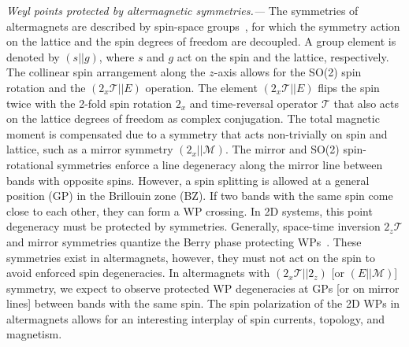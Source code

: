 \documentclass[aps,prb,twocolumn,amsmath,amssymb,floatfix]{revtex4-2}
\begin{document}
\textit{Weyl points protected by altermagnetic symmetries.---}
The symmetries of altermagnets are described by spin-space groups~\cite{https://doi.org/10.1002/pssb.2220100206,doi:10.1098/rspa.1966.0211,10.1063/1.1708514,LITVIN1974538,xiao2023spin,ren2023enumeration,jiang2023enumeration,chen2023spin,schiff2023spin}, for which the symmetry action on the lattice and the spin degrees of freedom are decoupled. A group element is denoted by $(s||g)$, where $s$ and $g$ act on the spin and the lattice, respectively. The collinear spin arrangement along the $z$-axis allows for the SO(2) spin rotation and the $(2_x \mathcal{T}||E)$ operation. The element $(2_x \mathcal{T}||E)$ flips the spin twice with the 2-fold spin rotation $2_x$ and time-reversal operator $\mathcal{T}$ that also acts on the lattice degrees of freedom as complex conjugation. The total magnetic moment is compensated due to a symmetry that acts non-trivially on spin and lattice, such as a mirror symmetry $(2_x||\mathcal{M})$. The mirror and SO(2) spin-rotational symmetries enforce a line degeneracy along the mirror line between bands with opposite spins. 
However, a spin splitting is allowed at a general position (GP) in the Brillouin zone (BZ). 
If two bands with the same spin come close to each other, they can form a WP crossing. In 2D systems, this point degeneracy must be protected by symmetries. Generally, space-time inversion $2_z\mathcal{T}$ and mirror symmetries quantize the Berry phase protecting WPs~\cite{chiu2018quantized}. These symmetries exist in altermagnets, however, they must not act on the spin to avoid enforced spin degeneracies. 
In altermagnets with $(2_x\mathcal{T}||2_z)$ [or $(E||\mathcal{M})$] symmetry, we expect to observe protected WP degeneracies at GPs [or on mirror lines] between bands with the same spin. 
The spin polarization of the 2D WPs in altermagnets
allows for an interesting interplay of spin currents, topology, and magnetism.

 
\end{document}
